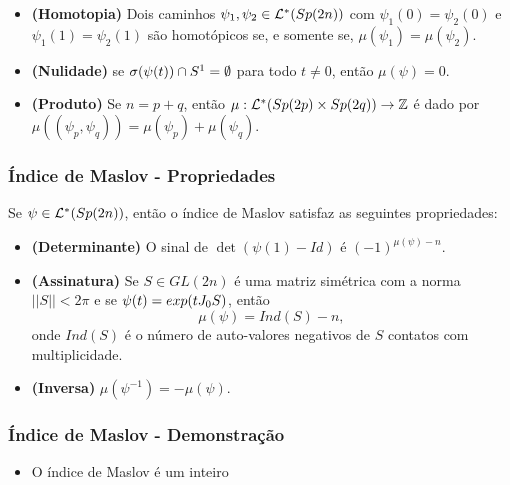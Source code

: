 \documentclass{beamer}
\begin{document}
\begin{footnotesize}
\begin{frame}
\begin{teorema}
\begin{itemize}
				\item \textbf{(Homotopia)} \label{item_homotopia_caminhos_teorema_indice_maslov} Dois caminhos $\psi_{1}, \psi_{2}\in \mathcal{L}^{*}(Sp(2n)) $ com $\psi_{1}(0) = \psi_{2}(0)$ e $\psi_{1}(1) = \psi_{2}(1)$ são homotópicos se, e somente se, $\mu(\psi_{1}) = \mu(\psi_{2})$.
				
				\item \textbf{(Nulidade)} se $\sigma(\psi(t))\cap S^{1} = \emptyset$ para todo $t\neq 0$, então $\mu(\psi) = 0$.
				
					\item \textbf{(Produto)} Se $n=p+q$, então  $\mu:\mathcal{L}^{*}(Sp(2p)\times Sp(2q)) \to \mathbb{Z}$ é dado por $\mu((\psi_{p}, \psi_{q})) = \mu(\psi_{p})+\mu(\psi_{q})$.
			\end{itemize}
		\end{teorema}
	\end{frame}
	
	\begin{frame}
		\frametitle{Índice de Maslov - Propriedades}
			\begin{teorema}
				Se $\psi \in \mathcal{L}^{*}(Sp(2n))$, então o índice de Maslov satisfaz as seguintes propriedades:
				\begin{itemize}
				\item \textbf{(Determinante)} O sinal de $ \det(\psi(1)-Id)$ é $(-1)^{\mu(\psi)-n}$.
					
					\item \textbf{(Assinatura)}\label{item_assinatura_maslov} Se $S \in GL(2n)$ é uma matriz simétrica com a norma $||S|| < 2\pi$ e se $\psi(t) = exp(tJ_{0} S)$, então 
					$$
					\mu(\psi) = Ind(S) - n,
					$$
					onde $Ind(S)$ é o número de auto-valores negativos de $S$ contatos com multiplicidade.
					
					\item \textbf{(Inversa)} $\mu(\psi^{-1}) = -\mu(\psi)$.
					
				\end{itemize}
			\end{teorema}
	\end{frame}
	
	
	\begin{frame}
		\frametitle{Índice de Maslov - Demonstração}
		\begin{prova}
			\begin{itemize}
				\item  O índice de Maslov é um inteiro
				

\end{itemize}
\end{prova}
\end{frame}
\end{footnotesize}
\end{document}
